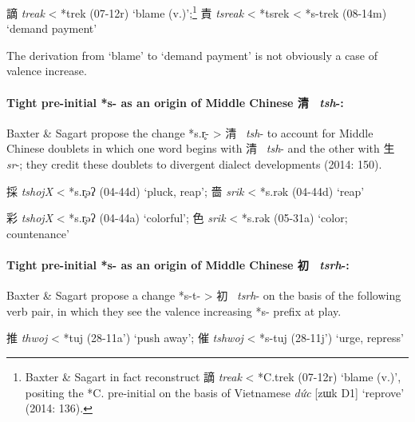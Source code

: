 \begin{description} \item
謫 \emph{treak} \textless{} *t{}rek (07-12r) `blame (v.)';\footnote{Baxter
  \& Sagart in fact reconstruct 謫 \emph{treak} \textless{} *C.t{}rek
  (07-12r) `blame (v.)', positing the *C. pre-initial on the basis of
  Vietnamese  \emph{dức} {[}zɯk D1] `reprove' (2014: 136). } 責
 \emph{tsreak} \textless{} *ts{}rek \textless{} *s-t{}rek (08-14m) `demand
payment'
\end{description}

The derivation from `blame' to `demand payment' is not obviously a case
of valence increase.

\paragraph{Tight pre-initial *s- as an origin
of Middle Chinese 清\textbf{~} \emph{\textbf{tsh}}\textbf{-:
}}Baxter \& Sagart propose the change *s.r̥{}- \textgreater{}
清~ \emph{tsh}- to account for Middle Chinese doublets in which one word
begins with 清~ \emph{tsh}- and the other with 生~ \emph{sr}-; they credit
these doublets to divergent dialect developments (2014: 150).

\begin{description} \item
採 \emph{tshojX} \textless{} *s.r̥{}əʔ (04-44d) `pluck, reap'; 嗇
 \emph{srik} \textless{} *s.rək (04-44d) `reap'
 \item
彩 \emph{tshojX} \textless{} *s.r̥{}əʔ (04-44a) `colorful'; 色  \emph{srik}
\textless{} *s.rək (05-31a) `color; countenance'
\end{description}

\paragraph{Tight pre-initial *s- as
an origin of Middle Chinese
初~ \emph{tsrh}-:} Baxter \& Sagart
propose a change *s-t{}{}- \textgreater{} 初~ \emph{tsrh}- on the basis of
the following verb pair, in which they see the valence increasing *s-
prefix at play.

\begin{description} \item
推 \emph{thwoj} \textless{} *t{}{}uj (28-11a') `push away'; 催
 \emph{tshwoj} \textless{} *s-t{}{}uj (28-11j') `urge, repress'
\end{description}

